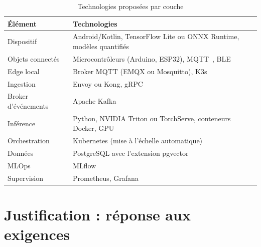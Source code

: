 \documentclass[11pt,a4paper]{report}
\begin{document}
\begin{table}[H]
\centering
\caption{Technologies proposées par couche}
\label{tab:technos}
\begin{tabularx}{\textwidth}{>{\raggedright\arraybackslash}p{3.4cm} L}
\toprule
{}\textbf{Élément} & \textbf{Technologies}\\
\midrule
Dispositif & Android/Kotlin, TensorFlow Lite ou ONNX Runtime, modèles quantifiés\\
Objets connectés & Microcontrôleurs (Arduino, ESP32), MQTT~\cite{mqtt5}, BLE\\
Edge local & Broker MQTT (EMQX ou Mosquitto), K3s\\
Ingestion & Envoy ou Kong, gRPC\\
Broker d'événements & Apache Kafka\\
Inférence & Python, NVIDIA Triton ou TorchServe, conteneurs Docker, GPU\\
Orchestration & Kubernetes (mise à l'échelle automatique)\\
Données & PostgreSQL avec l'extension pgvector\\
MLOps & MLflow\\
Supervision & Prometheus, Grafana\\
\bottomrule
\end{tabularx}
\end{table}

\section{Justification : réponse aux exigences}
\end{document}
